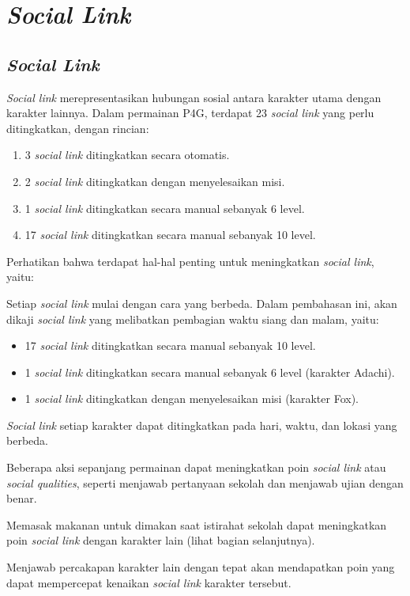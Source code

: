 \chapter{\textit{Social Link}}
\section{\textit{Social Link}}
\textit{Social link} merepresentasikan hubungan sosial antara karakter utama dengan karakter lainnya. Dalam permainan P4G, terdapat 23 \textit{social link} yang perlu ditingkatkan, dengan rincian:
\begin{enumerate}
    \item 3 \textit{social link} ditingkatkan secara otomatis.
    \item 2 \textit{social link} ditingkatkan dengan menyelesaikan misi.
    \item 1 \textit{social link} ditingkatkan secara manual sebanyak 6 level.
    \item 17 \textit{social link} ditingkatkan secara manual sebanyak 10 level.
\end{enumerate}
Perhatikan bahwa terdapat hal-hal penting untuk meningkatkan \textit{social link}, yaitu:
\begin{enumerate}
    {\item Setiap \textit{social link} mulai dengan cara yang berbeda. Dalam pembahasan ini, akan dikaji \textit{social link} yang melibatkan pembagian waktu siang dan malam, yaitu:
          \begin{itemize}
              \item 17 \textit{social link} ditingkatkan secara manual sebanyak 10 level.
              \item 1 \textit{social link} ditingkatkan secara manual sebanyak 6 level (karakter Adachi).
              \item 1 \textit{social link} ditingkatkan dengan menyelesaikan misi (karakter Fox).
          \end{itemize}
          }
    \item \textit{Social link} setiap karakter dapat ditingkatkan pada hari, waktu, dan lokasi yang berbeda.
    \item Beberapa aksi sepanjang permainan dapat meningkatkan poin \textit{social link} atau \textit{social qualities}, seperti menjawab pertanyaan sekolah dan menjawab ujian dengan benar.
    \item Memasak makanan untuk dimakan saat istirahat sekolah dapat meningkatkan poin \textit{social link} dengan karakter lain (lihat bagian selanjutnya).
    \item Menjawab percakapan karakter lain dengan tepat akan mendapatkan poin yang dapat mempercepat kenaikan \textit{social link} karakter tersebut.
\end{enumerate}

